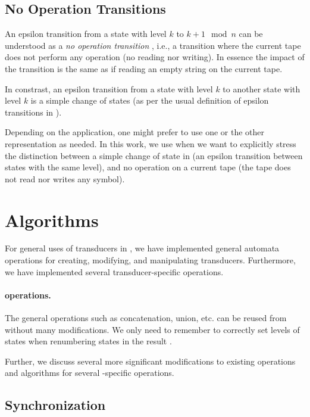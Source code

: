 \subsection{No Operation Transitions}
An epsilon transition from a state with level $k$ to $k+1 \mod n$ can be understood as a \emph{no operation transition} \nop, i.e., a transition where the current tape does not perform any operation (no reading nor writing). In essence the impact of the transition is the same as if reading an empty string on the current tape.

In constrast, an epsilon transition from a state with level $k$ to another state with level $k$ is a simple change of states (as per the usual definition of epsilon transitions in \nfas).

Depending on the application, one might prefer to use one or the other representation as needed.
In this work, we use \nop when we want to explicitly stress the distinction between a simple change of state in \nft (an epsilon transition between states with the same level), and no operation on a current tape (the tape does not read nor writes any symbol).

\section{Algorithms}
\label{sec:Algorithms}

For general uses of transducers in \mata, we have implemented general automata operations for creating, modifying, and manipulating transducers.
Furthermore, we have implemented several transducer-specific operations.

\paragraph{\nfa operations.}
The general \nfa operations such as concatenation, union, etc. can be reused from \nfa without many modifications.
We only need to remember to correctly set levels of states when renumbering states in the result \nft.

Further, we discuss several more significant modifications to existing operations and algorithms for several \nft-specific operations.

\subsection{Synchronization}

